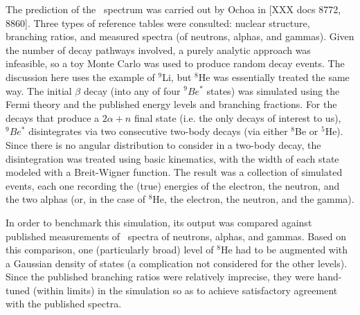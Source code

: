 \documentclass[../thesis.tex]{subfiles}
\begin{document}
The prediction of the \LiHe\ spectrum was carried out by Ochoa in [XXX docs
8772, 8860]. Three types of reference tables were consulted: nuclear structure,
branching ratios, and measured spectra (of neutrons, alphas, and gammas). Given
the number of decay pathways involved, a purely analytic approach was
infeasible, so a toy Monte Carlo was used to produce random decay events. The
discussion here uses the example of $^9$Li, but $^8$He was essentially treated
the same way. The initial $\beta$ decay (into any of four $^9Be^*$ states) was
simulated using the Fermi theory and the published energy levels and branching
fractions. For the decays that produce a $2\alpha+n$ final state (i.e. the only
decays of interest to us), $^9Be^*$ disintegrates via two consecutive two-body
decays (via either $^8$Be or $^5$He). Since there is no angular distribution to
consider in a two-body decay, the disintegration was treated using basic
kinematics, with the width of each state modeled with a Breit-Wigner
function. The result was a collection of simulated events, each one recording
the (true) energies of the electron, the neutron, and the two alphas (or, in the
case of $^8$He, the electron, the neutron, and the gamma).

In order to benchmark this simulation, its output was compared against published
measurements of \LiHe\ spectra of neutrons, alphas, and gammas. Based on this
comparison, one (particularly broad) level of $^8$He had to be augmented with a
Gaussian density of states (a complication not considered for the other
levels). Since the published branching ratios were relatively imprecise, they
were hand-tuned (within limits) in the simulation so as to achieve satisfactory
agreement with the published spectra.
\end{document}
